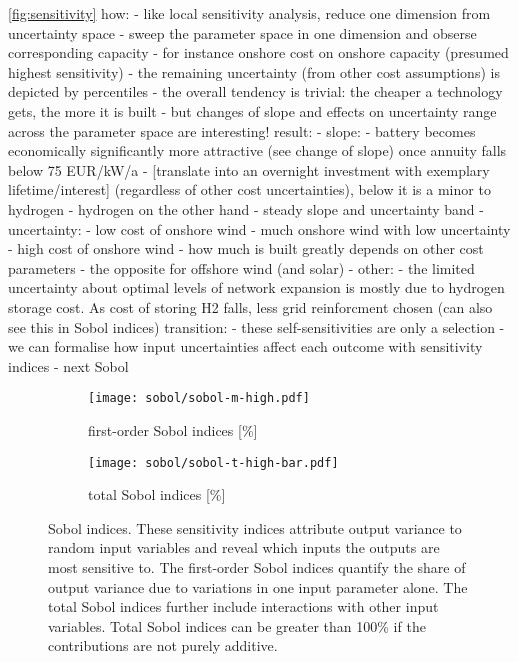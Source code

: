\cref{fig:sensitivity}
how:
- like local sensitivity analysis, reduce one dimension from uncertainty space
- sweep the parameter space in one dimension and obserse corresponding capacity
- for instance onshore cost on onshore capacity (presumed highest sensitivity)
- the remaining uncertainty (from other cost assumptions) is depicted by percentiles
- the overall tendency is trivial: the cheaper a technology gets, the more it is built
- but changes of slope and effects on uncertainty range across the parameter space are interesting!
result:
- slope:
  - battery  becomes economically significantly more attractive (see change of slope) once annuity falls below 75 EUR/kW/a
  - [translate into an overnight investment with exemplary lifetime/interest] (regardless of other cost uncertainties), below it is a minor to hydrogen
  - hydrogen on the other hand - steady slope and uncertainty band
- uncertainty:
  - low cost of onshore wind - much onshore wind with low uncertainty
  - high cost of onshore wind - how much is built greatly depends on other cost parameters
  - the opposite for offshore wind (and solar)
- other:
  - the limited uncertainty about optimal levels of network expansion is mostly due to hydrogen storage cost. As cost of storing H2 falls, less grid reinforcment chosen (can also see this  in Sobol indices)
transition:
- these self-sensitivities are only a selection
- we can formalise how input uncertainties affect each outcome with sensitivity indices
- next Sobol


\begin{figure}
    \begin{subfigure}[t]{0.45\textwidth}
        \caption{first-order Sobol indices [\%]}
        \label{fig:sobol:first}
        \texttt{[image: sobol/sobol-m-high.pdf]}
    \end{subfigure}
    \begin{subfigure}[t]{0.54\textwidth}
        \caption{total Sobol indices [\%]}
        \label{fig:sobol:total}
        \texttt{[image: sobol/sobol-t-high-bar.pdf]}
    \end{subfigure}
    \caption[First-order and total Sobol indices]{
      Sobol indices. These sensitivity indices attribute output variance to random input variables
      and reveal which inputs the outputs are most sensitive to. The first-order Sobol indices
      quantify the share of output variance due to variations in one input parameter alone.
      The total Sobol indices further include interactions with other input variables.
      Total Sobol indices can be greater than 100\% if the contributions are not purely additive.
    }
    \label{fig:sobol}
\end{figure}

